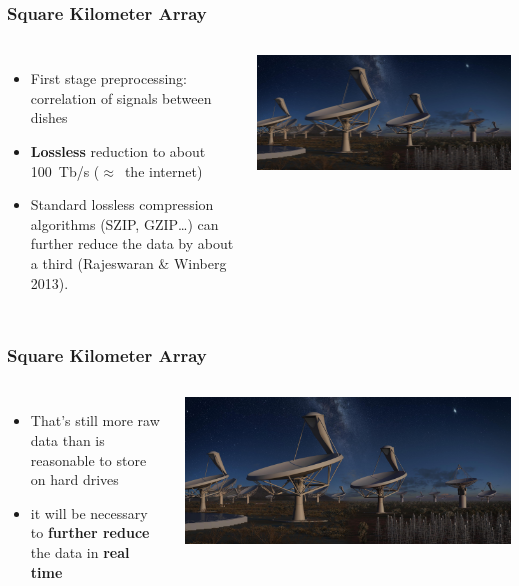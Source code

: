 \documentclass[10pt, compress]{beamer}
\begin{document}
\begin{frame}[fragile]
    \frametitle{Square Kilometer Array}
    \begin{columns}
            \begin{itemize}
                \item First stage preprocessing: correlation of signals between dishes
                \item \textbf{Lossless} reduction to about 100~Tb/s ($\approx$~the internet)
                \item Standard lossless compression algorithms (SZIP, GZIP…) can further reduce the data by about a third (Rajeswaran \& Winberg 2013).
            \end{itemize}
            \vspace{.01cm}
            \includegraphics[height=\textheight]{assets/skaall_night.jpg}
    \end{columns}
\end{frame}
\begin{frame}[fragile]
    \frametitle{Square Kilometer Array}
    \begin{columns}
            \begin{itemize}
                \item That's still more raw data than is reasonable to store on hard drives
                \item it will be necessary to \textbf{further reduce} the data in \textbf{real time}
            \end{itemize}
            \vspace{.01cm}
            \includegraphics[height=\textheight]{assets/skaall_night.jpg}
    \end{columns}
\end{frame}
\end{document}
